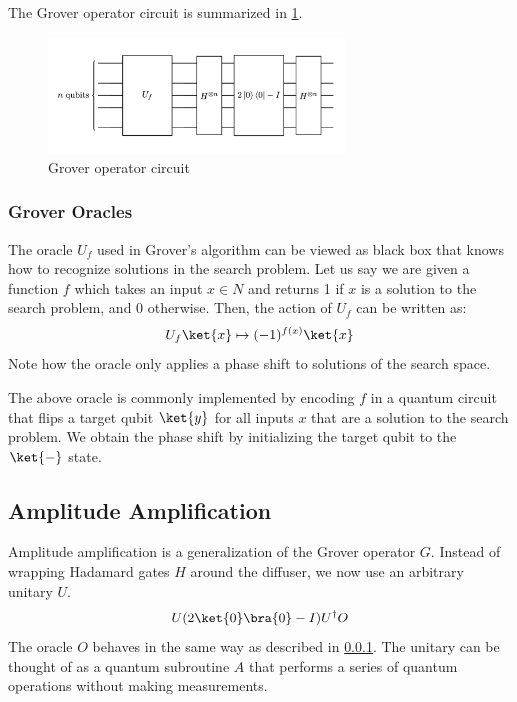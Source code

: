 \documentclass[11pt]{article}
\theoremstyle{definition}
\theoremstyle{remark}
\begin{document}
The Grover operator circuit is summarized in \cref{fig:grover_operator_circuit}.

\begin{figure}[!h]
  \centering
  \includegraphics[width=0.7\textwidth]{../presentation/assets/grover_operator.png}
  \caption{Grover operator circuit}
  \label{fig:grover_operator_circuit}
\end{figure}

\subsubsection{Grover Oracles} \label{sec:grover_oracles}

The oracle $U_f$ used in Grover’s algorithm can be viewed as black box that
knows how to recognize solutions in the search problem. Let us say we are given
a function $f$ which takes an input $x \in N$ and returns 1 if $x$ is a
solution to the search problem, and 0 otherwise. Then, the action of $U_f$ can
be written as:
\begin{equation}
  U_f\ket{x} \mapsto (-1)^{f(x)}\ket{x}
\end{equation}
Note how the oracle only applies a phase shift to solutions of the search
space. 

The above oracle is commonly implemented by encoding $f$ in a quantum circuit
that flips a target qubit $\ket{y}$ for all inputs $x$ that are a solution to the
search problem. We obtain the phase shift by initializing the target qubit to
the $\ket{-}$ state.

\subsection{Amplitude Amplification} \label{sec:amplitude_amplification}

Amplitude amplification is a generalization of the Grover operator $G$. Instead
of wrapping Hadamard gates $H$ around the diffuser, we now use an arbitrary
unitary $U$.
\begin{equation}
  U(2\ket{0}\bra{0} - I)U^{\dagger}O
\end{equation}
The oracle $O$ behaves in the same way as described in \cref{sec:grover_oracles}.
The unitary can be thought of as a quantum subroutine $A$ that performs a
series of quantum operations without making measurements.
\end{document}

